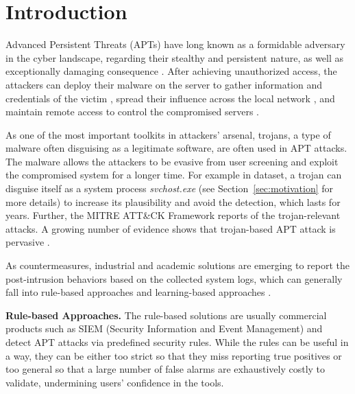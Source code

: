 \section{Introduction}
Advanced Persistent Threats (APTs) have long known as a formidable adversary in the cyber landscape,
regarding their stealthy and persistent nature, 
as well as exceptionally damaging consequence \cite{xx, xx, xx, xx, xx}.
After achieving unauthorized access, 
the attackers can deploy their malware on the server to 
gather information and credentials of the victim \cite{xx, xx},
spread their influence across the local network \cite{xx, xx}, and
maintain remote access to control the compromised servers \cite{xx, xx}.

As one of the most important toolkits in attackers' arsenal,
trojans, a type of malware often disguising as a legitimate software,  
are often used in APT attacks.
The malware allows the attackers to 
be evasive from user screening and
exploit the compromised system for a longer time.
For example in  dataset, 
a trojan can disguise itself as a system process \textit{svchost.exe} (see Section~\ref{sec:motivation} for more details)
to increase its plausibility and avoid the detection,
which lasts for  years.
Further, the MITRE ATT\&CK Framework reports  of the trojan-relevant attacks.
A growing number of evidence shows that trojan-based APT attack is 
pervasive \cite{valeros2020growth, xx}. 


As countermeasures, industrial and academic solutions \cite{karantzas2021empirical, cheng2023kairos,alsaheel2021atlas,han2020unicorn,inam2022sok,han2021sigl} are emerging to
report the post-intrusion behaviors based on the collected system logs,
which can generally fall into rule-based approaches \cite{milajerdi2019holmes,milajerdi2019poirot,hossain2020combating} and learning-based approaches \cite{liu2018towards,hassan2019nodoze,hassan2020we, wang2022threatrace,han2020unicorn,wang2020you}. 

\noindent\textbf{Rule-based Approaches.}
The rule-based solutions are usually commercial products \cite{milajerdi2019holmes,milajerdi2019poirot,hossain2020combating} such as SIEM (Security Information and Event Management) and  detect APT attacks via predefined security rules.
While the rules can be useful in a way,
they can be either too strict so that they miss reporting true positives or
too general so that a large number of false alarms are exhaustively costly to validate,
undermining users' confidence in the tools.

